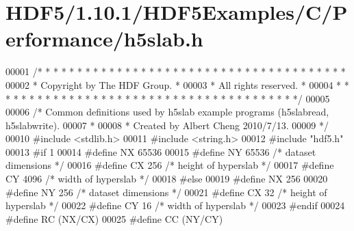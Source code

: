 \hypertarget{_h_d_f5_21_810_81_2_h_d_f5_examples_2_c_2_performance_2h5slab_8h_source}{}\section{H\+D\+F5/1.10.1/\+H\+D\+F5\+Examples/\+C/\+Performance/h5slab.h}
\label{_h_d_f5_21_810_81_2_h_d_f5_examples_2_c_2_performance_2h5slab_8h_source}

\begin{DoxyCode}
00001 \textcolor{comment}{/* * * * * * * * * * * * * * * * * * * * * * * * * * * * * * * * * * * * * * *}
00002 \textcolor{comment}{ * Copyright by The HDF Group.                                               *}
00003 \textcolor{comment}{ * All rights reserved.                                                      *}
00004 \textcolor{comment}{ * * * * * * * * * * * * * * * * * * * * * * * * * * * * * * * * * * * * * * */}
00005 
00006 \textcolor{comment}{/* Common definitions used by h5slab example programs (h5slabread, h5slabwrite).}
00007 \textcolor{comment}{ *}
00008 \textcolor{comment}{ * Created by Albert Cheng 2010/7/13.}
00009 \textcolor{comment}{ */}
00010 \textcolor{preprocessor}{#include <stdlib.h>}
00011 \textcolor{preprocessor}{#include <string.h>}
00012 \textcolor{preprocessor}{#include "hdf5.h"}
00013 \textcolor{preprocessor}{#if 1}
00014 \textcolor{preprocessor}{#define NX    65536  }
00015 \textcolor{preprocessor}{#define NY    65536       }\textcolor{comment}{/* dataset dimensions */}\textcolor{preprocessor}{}
00016 \textcolor{preprocessor}{#define CX    256        }\textcolor{comment}{/* height of hyperslab */}\textcolor{preprocessor}{}
00017 \textcolor{preprocessor}{#define CY    4096        }\textcolor{comment}{/* width of hyperslab */}\textcolor{preprocessor}{}
00018 \textcolor{preprocessor}{#else}
00019 \textcolor{preprocessor}{#define NX    256  }
00020 \textcolor{preprocessor}{#define NY    256       }\textcolor{comment}{/* dataset dimensions */}\textcolor{preprocessor}{}
00021 \textcolor{preprocessor}{#define CX    32        }\textcolor{comment}{/* height of hyperslab */}\textcolor{preprocessor}{}
00022 \textcolor{preprocessor}{#define CY    16        }\textcolor{comment}{/* width of hyperslab */}\textcolor{preprocessor}{}
00023 \textcolor{preprocessor}{#endif}
00024 \textcolor{preprocessor}{#define RC    (NX/CX)}
00025 \textcolor{preprocessor}{#define CC    (NY/CY)}
\end{DoxyCode}
